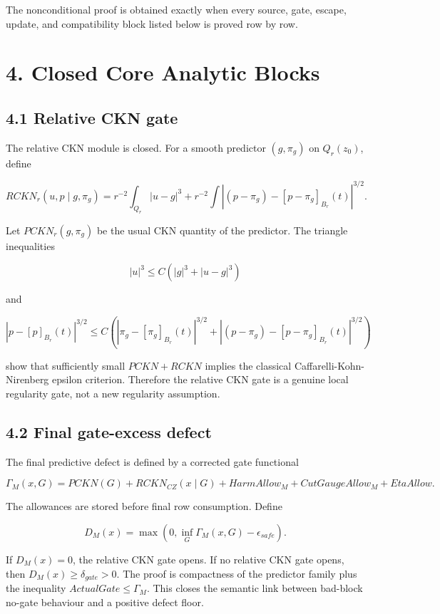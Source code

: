 \documentclass[11pt]{article}
\begin{document}
The nonconditional proof is obtained exactly when every source, gate, escape, update, and compatibility block listed below is proved row by row.

\section*{4. Closed Core Analytic Blocks}

\subsection*{4.1 Relative CKN gate}

The relative CKN module is closed. For a smooth predictor \((g,\pi_g)\) on \(Q_r(z_0)\), define

\[RCKN_r(u,p\mid g,\pi_g)
=r^{-2}\int_{Q_r}|u-g|^3
+r^{-2}\int |(p-\pi_g)-[p-\pi_g]_{B_r}(t)|^{3/2}.\]

Let \(PCKN_r(g,\pi_g)\) be the usual CKN quantity of the predictor. The triangle inequalities

\[|u|^3\le C(|g|^3+|u-g|^3)\]

and

\[|p-[p]_{B_r}(t)|^{3/2}
\le C\left(|\pi_g-[\pi_g]_{B_r}(t)|^{3/2}
+|(p-\pi_g)-[p-\pi_g]_{B_r}(t)|^{3/2}\right)\]

show that sufficiently small \(PCKN+RCKN\) implies the classical Caffarelli-Kohn-Nirenberg epsilon criterion. Therefore the relative CKN gate is a genuine local regularity gate, not a new regularity assumption.

\subsection*{4.2 Final gate-excess defect}

The final predictive defect is defined by a corrected gate functional

\[\Gamma_M(x,G)
=PCKN(G)+RCKN_{CZ}(x\mid G)+HarmAllow_M+CutGaugeAllow_M+EtaAllow.\]

The allowances are stored before final row consumption. Define

\[D_M(x)=\max(0,\inf_G \Gamma_M(x,G)-\epsilon_{safe}).\]

If \(D_M(x)=0\), the relative CKN gate opens. If no relative CKN gate opens, then \(D_M(x)\ge \delta_{gate}>0\). The proof is compactness of the predictor family plus the inequality \(ActualGate\le \Gamma_M\). This closes the semantic link between bad-block no-gate behaviour and a positive defect floor.
\end{document}
